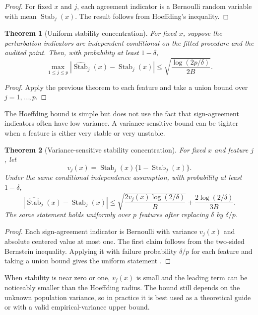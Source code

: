 \documentclass[11pt]{article}
\newtheorem{theorem}{Theorem}
\begin{document}
\begin{proof}
For fixed $x$ and $j$, each agreement indicator is a Bernoulli random variable with mean $\operatorname{Stab}_j(x)$. The result follows from Hoeffding's inequality.
\end{proof}

\begin{theorem}[Uniform stability concentration]
For fixed $x$, suppose the perturbation indicators are independent conditional on the fitted procedure and the audited point. Then, with probability at least $1-\delta$,
\[
\max_{1\leq j\leq p}
\left|
\widehat{\operatorname{Stab}}_j(x)
-
\operatorname{Stab}_j(x)
\right|
\leq
\sqrt{\frac{\log(2p/\delta)}{2B}}.
\]
\end{theorem}

\begin{proof}
Apply the previous theorem to each feature and take a union bound over $j=1,\ldots,p$.
\end{proof}

The Hoeffding bound is simple but does not use the fact that sign-agreement indicators often have low variance. A variance-sensitive bound can be tighter when a feature is either very stable or very unstable.

\begin{theorem}[Variance-sensitive stability concentration]
For fixed $x$ and feature $j$, let
\[
v_j(x)=\operatorname{Stab}_j(x)\{1-\operatorname{Stab}_j(x)\}.
\]
Under the same conditional independence assumption, with probability at least $1-\delta$,
\[
\left|
\widehat{\operatorname{Stab}}_j(x)
-
\operatorname{Stab}_j(x)
\right|
\leq
\sqrt{
\frac{2v_j(x)\log(2/\delta)}{B}
}
+
\frac{2\log(2/\delta)}{3B}.
\]
The same statement holds uniformly over $p$ features after replacing $\delta$ by $\delta/p$.
\end{theorem}

\begin{proof}
Each sign-agreement indicator is Bernoulli with variance $v_j(x)$ and absolute centered value at most one. The first claim follows from the two-sided Bernstein inequality. Applying it with failure probability $\delta/p$ for each feature and taking a union bound gives the uniform statement \citep{boucheron2013concentration}.
\end{proof}

When stability is near zero or one, $v_j(x)$ is small and the leading term can be noticeably smaller than the Hoeffding radius. The bound still depends on the unknown population variance, so in practice it is best used as a theoretical guide or with a valid empirical-variance upper bound.
\end{document}
